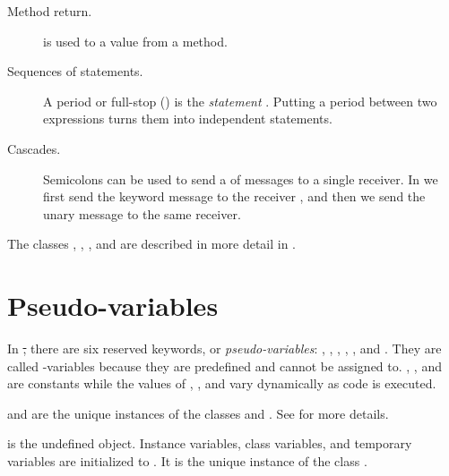 \documentclass[a4paper,10pt,twoside]{book}
\begin{document}
\begin{description}
\item[Method return.]
	\ct{^} is used to  a value from a method.

\item[Sequences of statements.]
	A period or full-stop () is the \emph{statement} .
	Putting a period between two expressions turns them into independent statements.

\item[Cascades.]
	Semicolons can be used to send a  of messages to a single receiver.
	In  we first send the keyword message  to the receiver , and then we send the unary message  to the same receiver.

\end{description}

The classes , , , and  are described in more detail in .


\section{Pseudo-variables}

In \st, there are six reserved keywords, or \emph{pseudo-variables}:
, , , , , and .
They are called -variables because they are predefined and cannot be assigned to.
, , and  are constants while the values of , , and  vary dynamically as code is executed.

 and  are the unique instances of the  classes  and .
See  for more details.

 is the undefined object.
Instance variables, class variables, and temporary variables are initialized to .
It is the unique instance of the class .
\end{document}
